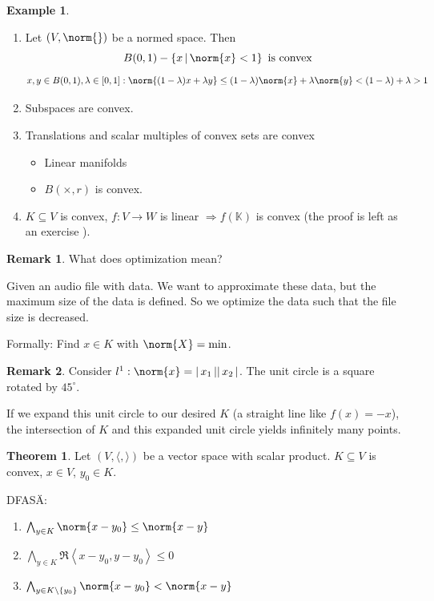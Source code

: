 \documentclass[a4paper,landscape,twocolumn]{article}
\newcommand\abs[1]{|\,#1\,|}
\newcommand\set[1]{\left\{#1\right\}}
\newcommand\setdef[2]{\left\{#1\,\middle|\,#2\right\}}
\newcommand\functional[1]{\left\langle{#1}\right\rangle}
\theoremstyle{definition}
\newtheorem{theorem}{Theorem}
\newtheorem{ex}{Example}
\newtheorem{rem}{Remark}
\DeclarePairedDelimiter\norm\lVert\rVert
\begin{document}
\begin{ex}
  \label{bsp-8.45}
  \begin{enumerate}
    \item Let $(V, \norm{ })$ be a normed space. Then
      \[ B(0,1) - \setdef{x}{\norm{x} < 1} \text{ is convex} \]
      \[ x,y \in B(0,1), \lambda \in [0,1]: \norm{(1 - \lambda) x + \lambda y} \leq (1 - \lambda) \norm{x} + \lambda \norm{y} < (1 - \lambda) + \lambda > 1 \]
    \item Subspaces are convex.
    \item Translations and scalar multiples of convex sets are convex
      \begin{itemize}
        \item Linear manifolds
        \item $B(\times, r)$ is convex.
      \end{itemize}
    \item $K \subseteq V$ is convex, $f: V \to W$ is linear $\Rightarrow f(\mathbb K)$ is convex (the proof is left as an exercise  ).
  \end{enumerate}
\end{ex}

\begin{rem}
  What does optimization mean?

  Given an audio file with data. We want to approximate these data, but the maximum size of the data is defined.
  So we optimize the data such that the file size is decreased.

  Formally: Find $x \in K$ with $\norm{X} = \min$.
\end{rem}

\begin{rem}
  Consider $l^1: \norm{x} = \abs{x_1} \abs{x_2}$.
  The unit circle is a square rotated by $45^\circ$.

  If we expand this unit circle to our desired $K$ (a straight line like $f(x) = -x$),
  the intersection of $K$ and this expanded unit circle yields infinitely many points.
\end{rem}

\begin{theorem}
  \label{satz-8.46}
  Let $(V, \langle, \rangle)$ be a vector space with scalar product.
  $K \subseteq V$ is convex, $x \in V$, $y_0 \in K$.

  DFASÄ:
  \begin{enumerate}
    \item $\bigwedge_{y \in K} \norm{x - y_0} \leq \norm{x - y}$
    \item $\bigwedge_{y \in K} \Re\functional{x - y_0, y - y_0} \leq 0$
    \item $\bigwedge_{y \in K \setminus \set{y_0}} \norm{x - y_0} < \norm{x - y}$
  \end{enumerate}
\end{theorem}
\end{document}
